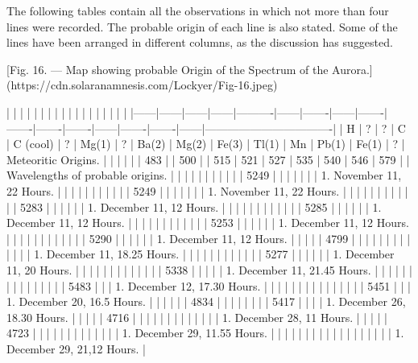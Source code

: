 \documentclass[a4paper, 12pt, oneside, polutonikogreek, english]{article}
\begin{document}
The following tables contain all the observations in which not more than four lines were recorded. The probable origin of each line is also stated. Some of the lines have been arranged in different columns, as the discussion has suggested.

[Fig. 16. --- Map showing probable Origin of the Spectrum of the Aurora.](https://cdn.solaranamnesis.com/Lockyer/Fig-16.jpeg)

|   |   |   |   |     |   |    |   |    |    |    |    |   |    |    |   |                 |
|------|------|------|------|----------|------|-------|------|-------|-------|-------|-------|------|-------|-------|------|----------------------------------|
| H  | ?  | ?  | C  | C (cool) | ?  | Mg(1) | ?  | Ba(2) | Mg(2) | Fe(3) | Tl(1) | Mn  | Pb(1) | Fe(1) | ?  | Meteoritic Origins.       |
|   |   |   |   | 483   |   | 500  |   | 515  | 521  | 527  | 535  | 540 | 546  | 579  |   | Wavelengths of probable origins. |
|   |   |   |   |     |   |    |   |    | 5249 |    |    |   |    |    |   | 1. November 11, 22 Hours.    |
|   |   |   |   |     |   |    |   |    | 5249 |    |    |   |    |    |   | 1. November 11, 22 Hours.    |
|   |   |   |   |     |   |    |   |    |    | 5283 |    |   |    |    |   | 1. December 11, 12 Hours.    |
|   |   |   |   |     |   |    |   |    |    | 5285 |    |   |    |    |   | 1. December 11, 12 Hours.    |
|   |   |   |   |     |   |    |   |    |    | 5253 |    |   |    |    |   | 1. December 11, 12 Hours.    |
|   |   |   |   |     |   |    |   |    |    | 5290 |    |   |    |    |   | 1. December 11, 12 Hours.    |
|   |   |   | 4799 |     |   |    |   |    |    |    |    |   |    |    |   | 1. December 11, 18.25 Hours.   |
|   |   |   |   |     |   |    |   |    |    | 5277 |    |   |    |    |   | 1. December 11, 20 Hours.    |
|   |   |   |   |     |   |    |   |    |    |    | 5338 |   |    |    |   | 1. December 11, 21.45 Hours.   |
|   |   |   |   |     |   |    |   |    |    |    |    |   | 5483 |    |   | 1. December 12, 17.30 Hours.   |
|   |   |   |   |     |   |    |   |    |    |    |    |   | 5451 |    |   | 1. December 20, 16.5 Hours.   |
|   |   |   |   | 4834   |   |    |   |    |    |    |    | 5417 |    |    |   | 1. December 26, 18.30 Hours.   |
|   |   |   | 4716 |     |   |    |   |    |    |    |    |   |    |    |   | 1. December 28, 11 Hours.    |
|   |   |   | 4723 |     |   |    |   |    |    |    |    |   |    |    |   | 1. December 29, 11.55 Hours.   |
|   |   |   |   |     |   |    |   |    |    |    |    |   |    |    |   | 1. December 29, 21,12 Hours.   |
\end{document}

